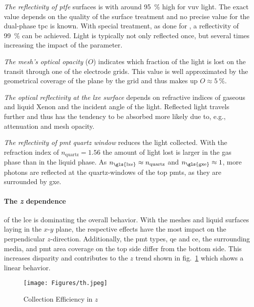 \emph{The reflectivity of \gls{ptfe}} surfaces is with around \SI{95}{\%} high for \gls{vuv} light.
The exact value depends on the quality of the surface treatment and no precise value for the dual-phase \gls{tpc} is known.
With special treatment, as done for \oneton, a reflectivity of \SI{99}{\%} can be achieved\cite{?}. %
Light is typically not only reflected once, but several times increasing the impact of the parameter.


\emph{The mesh's optical opacity} ($ O $) indicates which fraction of the light is lost on the transit through one of the electrode grids.
This value is well approximated by the geometrical coverage of the plane by the grid and thus makes up $ O \approx \SI{5}{\%} $.


\emph{The optical reflectivity at the \gls{lxe} surface} depends on refractive indices of gaseous and liquid Xenon and the incident angle of the light.
Reflected light travels further and thus has the tendency to be absorbed more likely due to, e.g., attenuation and mesh opacity.

\emph{The reflectivity of \gls{pmt} quartz window} reduces the light collected.
With the refraction index of $ n_\mathrm{quartz} = 1.56 $ the amount of light lost is larger in the gas phase than in the liquid phase.
As $ n_\mathrm{\gls{lxe}} \approx n_\mathrm{quartz} $ and $ n_\mathrm{\gls{gxe}} \approx 1 $, more photons are reflected at the quartz-windows of the top \glspl{pmt}, as they are surrounded by \gls{gxe}.


\paragraph{The \emph{z} dependence} of the \gls{lce} is dominating the overall behavior.
With the meshes and liquid surfaces laying in the $ x\mbox{-}y $ plane, the respective effects have the most impact on the perpendicular $ z $-direction.
Additionally, the \gls{pmt} types, \gls{qe} and \gls{ce}, the surrounding media, and \gls{pmt} area coverage on the top side differ from the bottom side.
This increases disparity and contributes to the $ z $ trend shown in fig.~\ref{fig:ce_vs_z} which shows a linear behavior.


\begin{figure}
\centering
\texttt{[image: Figures/th.jpeg]}  %
\caption[Collection Efficiency in $ z $]{
        Collection Efficiency in $ z $
    }
\label{fig:ce_vs_z}
\end{figure}

